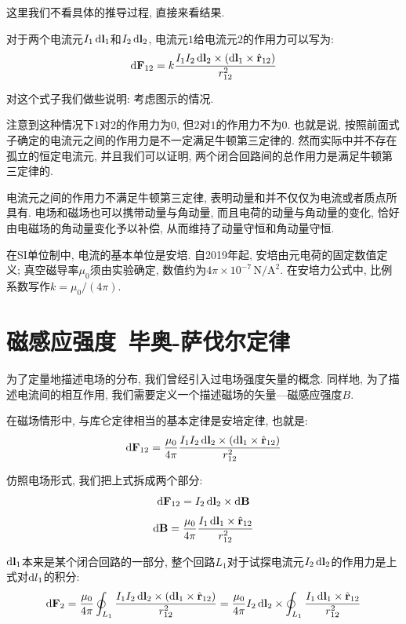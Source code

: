 这里我们不看具体的推导过程, 直接来看结果.

\begin{theorem}[安培定律]

对于两个电流元$I_1\mathop{}\!\mathrm{d} \mathbf{l}_1$和$I_2\mathop{}\!\mathrm{d} \mathbf{l}_2$, 电流元$1$给电流元$2$的作用力可以写为:
\[
\mathop{}\!\mathrm{d} \mathbf{F}_{12} = k\frac{I_1I_2\mathop{}\!\mathrm{d} \mathbf{l}_2\times(\mathop{}\!\mathrm{d} \mathbf{l}_1\times {\hat{\mathbf{r}}_{12}})}{r^2_{12}}
\]
\end{theorem}

对这个式子我们做些说明: 考虑图示的情况.

注意到这种情况下$1$对$2$的作用力为0, 但$2$对$1$的作用力不为0. 也就是说, 按照前面式子确定的电流元之间的作用力是不一定满足牛顿第三定律的. 然而实际中并不存在孤立的恒定电流元, 并且我们可以证明, 两个闭合回路间的总作用力是满足牛顿第三定律的.

电流元之间的作用力不满足牛顿第三定律, 表明动量和并不仅仅为电流或者质点所具有. 电场和磁场也可以携带动量与角动量, 而且电荷的动量与角动量的变化, 恰好由电磁场的角动量变化予以补偿, 从而维持了动量守恒和角动量守恒.

在SI单位制中, 电流的基本单位是安培. 自2019年起, 安培由元电荷的固定数值定义; 真空磁导率$\mu_0$须由实验确定, 数值约为$4\pi\times10^{-7}\,\mathrm{N/A^2}$. 在安培力公式中, 比例系数写作$k=\mu_0/(4\pi)$.


\section{\texorpdfstring{磁感应强度\, 毕奥-萨伐尔定律}{磁感应强度 毕奥-萨伐尔定律}}
为了定量地描述电场的分布, 我们曾经引入过电场强度矢量的概念. 同样地, 为了描述电流间的相互作用, 我们需要定义一个描述磁场的矢量---磁感应强度$B$.

在磁场情形中, 与库仑定律相当的基本定律是安培定律, 也就是:
\[
\mathop{}\!\mathrm{d} \mathbf{F}_{12} = \frac{\mu_0}{4\pi} \frac{I_1I_2\mathop{}\!\mathrm{d} \mathbf{l}_2\times(\mathop{}\!\mathrm{d} \mathbf{l}_1\times {\hat{\mathbf{r}}_{12}})}{r^2_{12}}
\]

仿照电场形式, 我们把上式拆成两个部分:
\[
\mathop{}\!\mathrm{d} \mathbf{F}_{12}=I_2\mathop{}\!\mathrm{d} \mathbf{l}_2\times \mathop{}\!\mathrm{d} \mathbf{B}
\]
\[
\mathop{}\!\mathrm{d} \mathbf{B} = \frac{\mu_0}{4\pi}\frac{I_1 \mathop{}\!\mathrm{d} \mathbf{l}_1\times \hat{\mathbf{r}}_{12}}{r^2_{12}}
\]

$\mathop{}\!\mathrm{d} \mathbf{l}_1$本来是某个闭合回路的一部分, 整个回路$L_1$对于试探电流元$I_2 \mathop{}\!\mathrm{d} \mathbf{l}_2$的作用力是上式对$\mathop{}\!\mathrm{d} l_1$的积分:
\[
\mathop{}\!\mathrm{d} \mathbf{F}_2 = \frac{\mu_0}{4\pi}\oint_{L_1}\frac{I_1I_2\mathop{}\!\mathrm{d} \mathbf{l}_2\times(\mathop{}\!\mathrm{d} \mathbf{l}_1\times {\hat{\mathbf{r}}_{12}})}{r^2_{12}}=\frac{\mu_0}{4\pi}I_2\mathop{}\!\mathrm{d} \mathbf{l}_2\times\oint_{L_1}\frac{I_1\mathop{}\!\mathrm{d} \mathbf{l}_1\times {\hat{\mathbf{r}}_{12}}}{r^2_{12}}
\]

